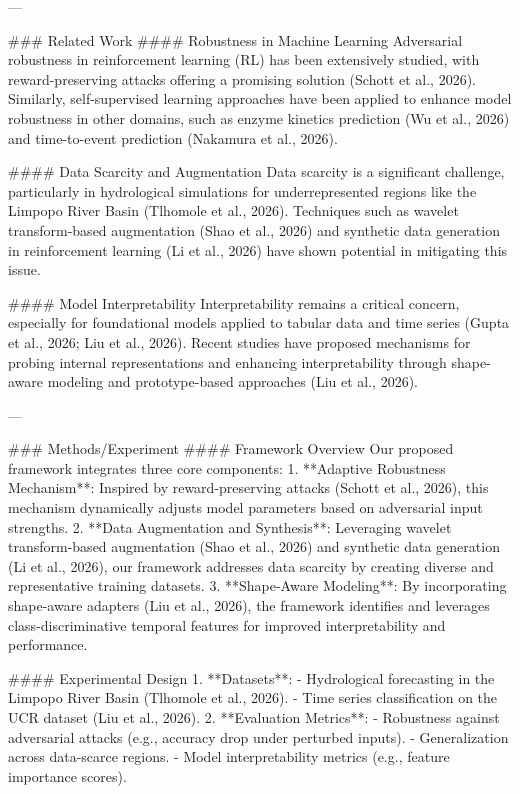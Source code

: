 ---

### Related Work
#### Robustness in Machine Learning
Adversarial robustness in reinforcement learning (RL) has been extensively studied, with reward-preserving attacks offering a promising solution (Schott et al., 2026). Similarly, self-supervised learning approaches have been applied to enhance model robustness in other domains, such as enzyme kinetics prediction (Wu et al., 2026) and time-to-event prediction (Nakamura et al., 2026).

#### Data Scarcity and Augmentation
Data scarcity is a significant challenge, particularly in hydrological simulations for underrepresented regions like the Limpopo River Basin (Tlhomole et al., 2026). Techniques such as wavelet transform-based augmentation (Shao et al., 2026) and synthetic data generation in reinforcement learning (Li et al., 2026) have shown potential in mitigating this issue.

#### Model Interpretability
Interpretability remains a critical concern, especially for foundational models applied to tabular data and time series (Gupta et al., 2026; Liu et al., 2026). Recent studies have proposed mechanisms for probing internal representations and enhancing interpretability through shape-aware modeling and prototype-based approaches (Liu et al., 2026).

---

### Methods/Experiment
#### Framework Overview
Our proposed framework integrates three core components:
1. **Adaptive Robustness Mechanism**: Inspired by reward-preserving attacks (Schott et al., 2026), this mechanism dynamically adjusts model parameters based on adversarial input strengths.
2. **Data Augmentation and Synthesis**: Leveraging wavelet transform-based augmentation (Shao et al., 2026) and synthetic data generation (Li et al., 2026), our framework addresses data scarcity by creating diverse and representative training datasets.
3. **Shape-Aware Modeling**: By incorporating shape-aware adapters (Liu et al., 2026), the framework identifies and leverages class-discriminative temporal features for improved interpretability and performance.

#### Experimental Design
1. **Datasets**:
   - Hydrological forecasting in the Limpopo River Basin (Tlhomole et al., 2026).
   - Time series classification on the UCR dataset (Liu et al., 2026).
2. **Evaluation Metrics**:
   - Robustness against adversarial attacks (e.g., accuracy drop under perturbed inputs).
   - Generalization across data-scarce regions.
   - Model interpretability metrics (e.g., feature importance scores).


